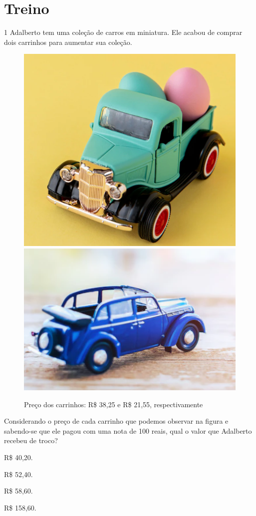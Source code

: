 
\section*{Treino}

\num{1} Adalberto tem uma coleção de carros em miniatura. Ele acabou de
comprar dois carrinhos para aumentar sua coleção.

\begin{figure}[htpb!]
\includegraphics[width=.5\textwidth]{./imgs/mat17a.png}
\includegraphics[width=.5\textwidth]{./imgs/mat17b.png}
\caption{Preço dos carrinhos: R\$ 38,25 e R\$ 21,55, respectivamente}
\end{figure}

Considerando o preço de cada carrinho que podemos observar na figura e sabendo-se que ele pagou com uma nota de 100 reais, qual o valor
que Adalberto recebeu de troco?

\begin{minipage}{.5\textwidth}
\begin{escolha}
\item
  R\$ 40,20.
\item
  R\$ 52,40.
\item
  R\$ 58,60.
\item
  R\$ 158,60.
\end{escolha}
\end{minipage}


